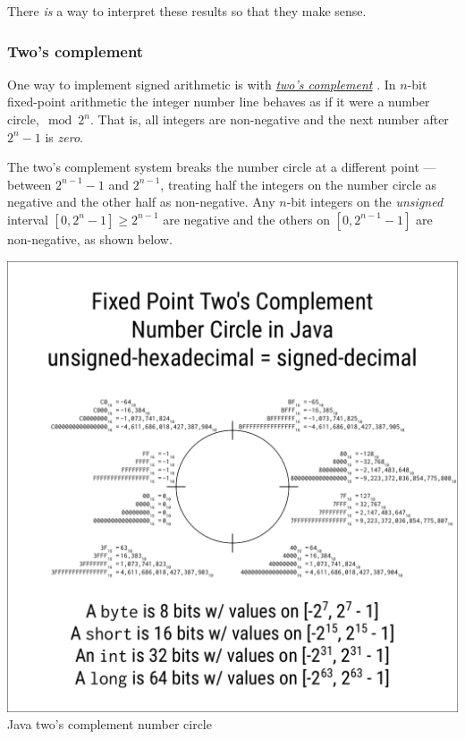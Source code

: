 \documentclass[11pt]{article}%
\begin{document}
\begin{multicols}{2}
There \textit{is} a way to interpret these results so that they make sense.

\subsubsection{Two's complement}
\label{TwosComplement}

One way to implement signed arithmetic is with \textit{\href{https://en.wikipedia.org/wiki/Two's_complement}{two's complement}} \citep{wiki:twos-complement}. In $n$-bit fixed-point arithmetic the integer number line behaves as if it were a number circle,$\mod 2^{n}$. That is, all integers are non-negative and the next number after $2^{n}-1$ is \textit{zero}.

The two's complement system breaks the number circle at a different point --- between $2^{n - 1} - 1$ and $2^{n - 1}$, treating half the integers on the number circle as negative and the other half as non-negative. Any $n$-bit integers on the \textit{unsigned} interval $[0, 2^{n}-1] \ge 2^{n-1}$ are negative and the others on $[0, 2^{n-1} - 1]$ are non-negative, as shown below.

\end{multicols}\begin{center}
\includegraphics*[scale = 0.75]{../../images/java-number-circle.pdf}
 \\Java two's complement number circle
\end{center}\begin{multicols}{2}


\end{multicols}
\end{document}
